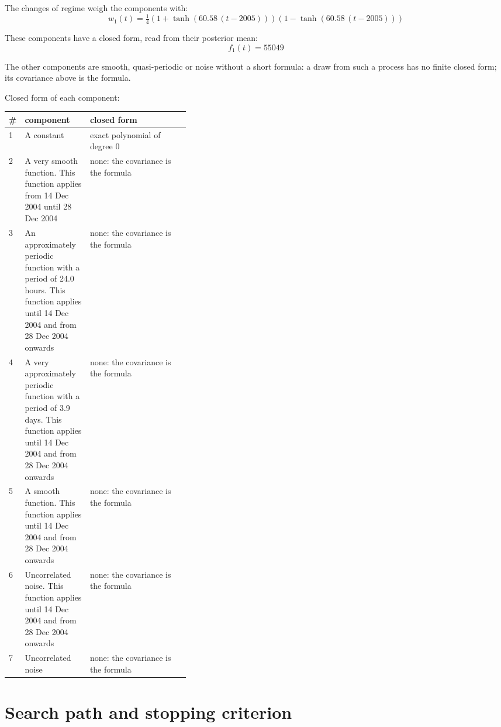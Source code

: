 \documentclass[11pt,a4paper]{article}
\begin{document}
The changes of regime weigh the components with:
\begin{dmath*}
w_{1}(t) = \tfrac{1}{4}\left(1 + \tanh\left(60.58\,(t - 2005)\right)\right)\left(1 - \tanh\left(60.58\,(t - 2005)\right)\right)
\end{dmath*}

These components have a closed form, read from their posterior mean:
\begin{dmath*}
f_{1}(t) = 55049
\end{dmath*}

The other components are smooth, quasi-periodic or noise without a short formula: a draw from such a process has no finite closed form; its covariance above is the formula.

Closed form of each component:

\begin{center}\footnotesize
\begin{tabular}{lp{0.36\linewidth}l}
\toprule
\# & component & closed form \\
\midrule
1 & A constant & exact polynomial of degree 0 \\
2 & A very smooth function. This function applies from 14 Dec 2004 until 28 Dec 2004 & none: the covariance is the formula \\
3 & An approximately periodic function with a period of 24.0 hours. This function applies until 14 Dec 2004 and from 28 Dec 2004 onwards & none: the covariance is the formula \\
4 & A very approximately periodic function with a period of 3.9 days. This function applies until 14 Dec 2004 and from 28 Dec 2004 onwards & none: the covariance is the formula \\
5 & A smooth function. This function applies until 14 Dec 2004 and from 28 Dec 2004 onwards & none: the covariance is the formula \\
6 & Uncorrelated noise. This function applies until 14 Dec 2004 and from 28 Dec 2004 onwards & none: the covariance is the formula \\
7 & Uncorrelated noise & none: the covariance is the formula \\
\bottomrule
\end{tabular}
\end{center}

\section*{Search path and stopping criterion}
\end{document}
